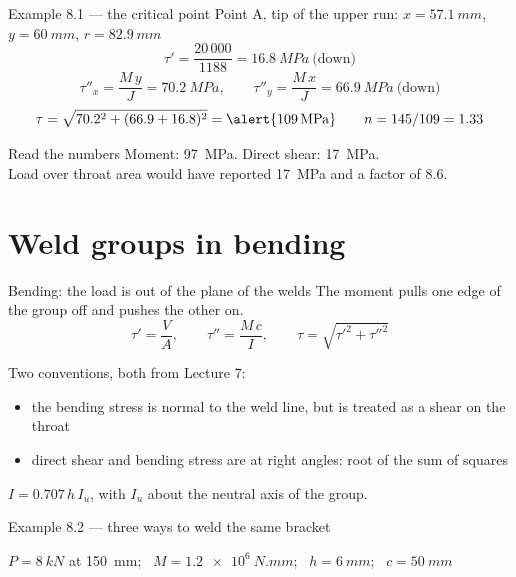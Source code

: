\documentclass[aspectratio=169,10pt]{beamer}
\begin{document}
\begin{frame}{Example 8.1 --- the critical point}
Point A, tip of the upper run: $x=\SI{57.1}{mm}$, $y=\SI{60}{mm}$, $r=\SI{82.9}{mm}$
\[ \tau'=\frac{20\,000}{1188}=\SI{16.8}{MPa}\ \text{(down)} \]
\[ \tau''_x=\frac{M\,y}{J}=\SI{70.2}{MPa},\qquad \tau''_y=\frac{M\,x}{J}=\SI{66.9}{MPa}\ \text{(down)} \]
\[ \tau=\sqrt{70.2^2+(66.9+16.8)^2}=\alert{\SI{109}{MPa}}\qquad n=145/109=1.33 \]
\vfill
\begin{alertblock}{Read the numbers}
Moment: \SI{97}{MPa}. Direct shear: \SI{17}{MPa}.\\
Load over throat area would have reported \SI{17}{MPa} and a factor of 8.6.
\end{alertblock}
\end{frame}

\section{Weld groups in bending}

\begin{frame}{Bending: the load is out of the plane of the welds}
The moment pulls one edge of the group off and pushes the other on.
\[ \tau'=\frac{V}{A},\qquad \tau''=\frac{M\,c}{I},\qquad \tau=\sqrt{\tau'^2+\tau''^2} \]

Two conventions, both from Lecture 7:
\begin{itemize}
  \item the bending stress is normal to the weld line, but is \alert{treated as a shear on the throat}
  \item direct shear and bending stress are at right angles: root of the sum of squares
\end{itemize}
\vfill
$I=0.707\,h\,I_u$, with $I_u$ about the neutral axis of the group.
\end{frame}

\begin{frame}{Example 8.2 --- three ways to weld the same bracket}
\centering
\resizebox{0.95\textwidth}{!}{}

\medskip
\small $P=\SI{8}{kN}$ at \SI{150}{mm}; \ $M=\SI{1.2e6}{N.mm}$; \ $h=\SI{6}{mm}$; \ $c=\SI{50}{mm}$
\end{frame}
\end{document}
